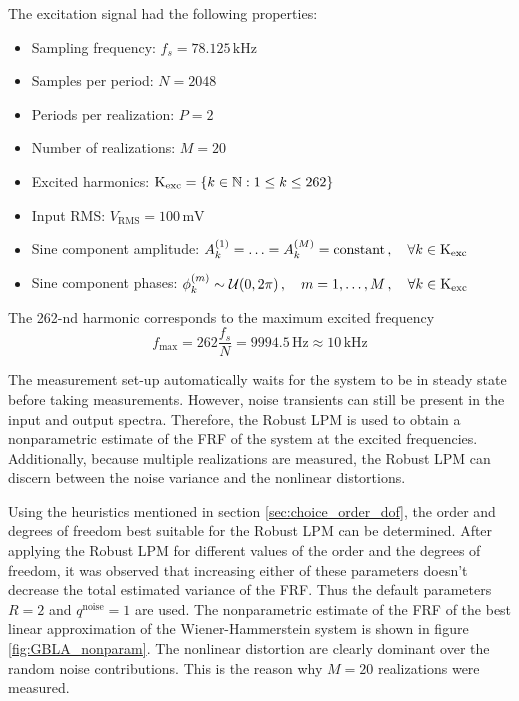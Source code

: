 \newpage
The excitation signal had the following properties:
\begin{itemize}
\item Sampling frequency: $f_s = 78.125 \,\textrm{kHz}$
\item Samples per period: $N = 2048$
\item Periods per realization: $P = 2$
\item Number of realizations: $M = 20$
\item Excited harmonics: $\text{K}_{\text{exc}} = \{k \in \mathbb{N} : 1 \leq k \leq 262\}$
\item Input RMS: $V_{\mathrm{RMS}} = 100 \, \textrm{mV}$
\item Sine component amplitude: $A_k^{(1)} = \ldots = A_k^{(M)} = \text{constant} \,, \quad \forall k \in \text{K}_{\text{exc}}$
\item Sine component phases: $\phi_k^{(m)} \sim \mathcal{U}(0,2\pi) \,, \quad m = 1, \ldots, M \,, \quad \forall k \in \text{K}_{\text{exc}}$ 
\end{itemize}
The 262-nd harmonic corresponds to the maximum excited frequency
\begin{equation*}
	f_{\mathrm{max}} = 262 \frac{f_s}{N} = 9994.5 \, \mathrm{Hz} \approx 10 \,\textrm{kHz}
\end{equation*}

The measurement set-up automatically waits for the system to be in steady state before taking measurements. However, noise transients can still be present in the input and output spectra. Therefore, the Robust LPM is used to obtain a nonparametric estimate of the FRF of the system at the excited frequencies. Additionally, because multiple realizations are measured, the Robust LPM can discern between the noise variance and the nonlinear distortions. 

Using the heuristics mentioned in section \ref{sec:choice_order_dof}, the order and degrees of freedom best suitable for the Robust LPM can be determined. After applying the Robust LPM for different values of the order and the degrees of freedom, it was observed that increasing either of these parameters doesn't decrease the total estimated variance of the FRF. Thus the default parameters $R=2$ and $q^{\mathrm{noise}}=1$ are used. The nonparametric estimate of the FRF of the best linear approximation of the Wiener-Hammerstein system is shown in figure \ref{fig:GBLA_nonparam}. The nonlinear distortion are clearly dominant over the random noise contributions. This is the reason why $M=20$ realizations were measured.

